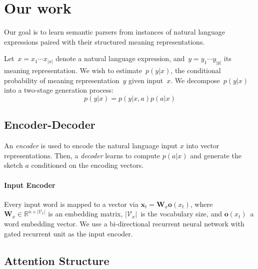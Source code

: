 \section{Our work}

Our goal is to learn semantic parsers from instances of natural language expressions paired with their structured meaning representations.

Let~$x = x_1 \cdots x_{|x|}$ denote a natural language expression, and~$y = y_1 \cdots y_{|y|}$ its meaning representation. We wish to estimate~$p\left(y | x\right)$, the conditional probability of meaning representation~$y$ given input~$x$. We decompose~$p\left(y | x\right)$ into a two-stage generation process:
\begin{equation}
\label{eq:overview}
p\left(y | x\right) = p\left(y | x, a \right) p\left(a | x\right)
\end{equation}

\subsection{Encoder-Decoder}
\label{sec:encoder}

An \textit{encoder} is used to encode the natural language input $x$ into vector representations. Then, a \textit{decoder} learns to compute $p\left( a | x \right)$ and generate the sketch $a$ conditioned on the encoding vectors.

\paragraph{Input Encoder}
Every input word is mapped to a vector via
$\mathbf{x}_t = \mathbf{W}_x \mathbf{o}\left( x_t \right) $, where
$\mathbf{W}_x \in \mathbb{R}^{n \times |\mathcal{V}_x|}$ is an
embedding matrix, $|\mathcal{V}_x|$~is the vocabulary size, and
$\mathbf{o}\left( x_t \right)$~a word embedding vector.  We use a
bi-directional recurrent neural network with gated recurrent unit as the input encoder.



\subsection{Attention Structure}
\label{sec:Attention}

